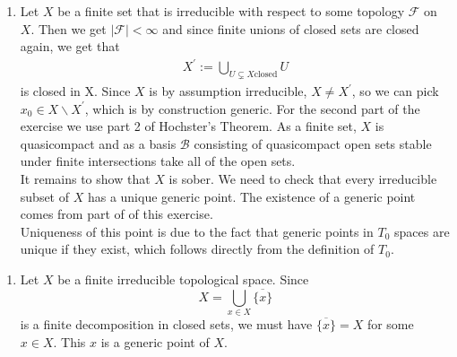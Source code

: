 \newcommand{\sheet}{4}




\maketitle{}

\begin{exercise}{1}
    \begin{enumerate}
        \item Let $X$ be a finite set that is irreducible with 
        respect to some topology $\mathcal{F}$ on $X$. Then we get
        $\mid \mathcal{F} \mid<\infty$ and since finite unions of
        closed sets are closed again, we get that
        \begin{align*}
            X^{\prime}:=\bigcup_{U \subsetneq X \text{closed}}{U}
        \end{align*}
        is closed in X. Since $X$ is by assumption irreducible,
        $X\neq X^{\prime}$, so we can pick $x_0\in X \backslash X^{\prime}$,
        which is by construction generic. For the second part of the exercise we use 
        part 2 of Hochster's Theorem. As a finite set, $X$ is 
        quasicompact and as a basis $\mathcal{B}$ consisting of quasicompact 
        open sets stable under finite intersections take all of the open sets. \\
        It remains to show that $X$ is sober. We need to check that every irreducible
        subset of $X$ has a unique generic point. The existence of a generic point comes
        from part of of this exercise. \\
        Uniqueness of this point is due to the fact
        that generic points in $T_0$ spaces are unique if they exist, which follows directly
        from the definition of $T_0$. 
    \end{enumerate}
    
    \begin{enumerate}
        \item{Let $X$ be a finite irreducible topological space. Since
            \begin{equation*}
                X = \bigcup_{x \in X} \overline{\{x\}}
            \end{equation*}
            is a finite decomposition in closed sets, we must have
            $\overline{\{x\}} = X$ for some $x \in X$. This $x$ is a generic
            point of $X$.

}
\end{enumerate}
\end{exercise}
